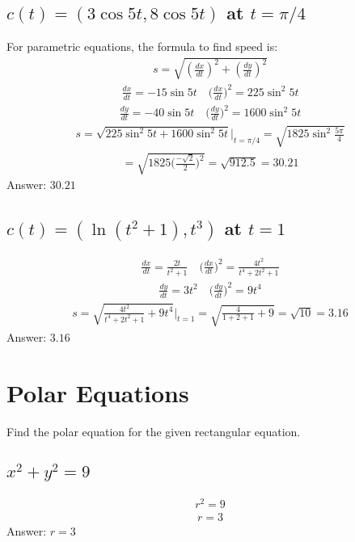 \documentclass{article}
\begin{document}
\subsection{$c(t) = (3 \cos{5t}, 8 \cos{5t})$ at $t = \pi /4$}
For parametric equations, the formula to find speed is:
\begin{align*}
	s = \sqrt{(\frac{dx}{dt})^2 + (\frac{dy}{dt})^2}
\end{align*}
\begin{align*}
	\frac{dx}{dt} = -15\sin{5t} \quad \bigg( \frac{dx}{dt} \bigg)^2 = 225 \sin^2{5t}
\end{align*}
\begin{align*}
	\frac{dy}{dt} = -40 \sin{5t} \quad \bigg( \frac{dy}{dt} \bigg)^2 = 1600 \sin^2{5t}
\end{align*}
\begin{align*}
	s = \sqrt{225\sin^2{5t} + 1600 \sin^2{5t}} \bigg|_{t = \pi/4} = \sqrt{1825 \sin^2{\frac{5\pi}{4}}}
\end{align*}
\begin{align*}
	= \sqrt{1825 \bigg( \frac{-\sqrt{2}}{2} \bigg)^2} = \sqrt{912.5} = 30.21
\end{align*}
Answer: $30.21$

\subsection{$c(t) = (\ln(t^2 + 1), t^3)$ at $t = 1$}
\begin{align*}
	\frac{dx}{dt} = \frac{2t}{t^2 +1} \quad \bigg( \frac{dx}{dt} \bigg)^2 = \frac{4t^2}{t^4 + 2t^2 + 1}
\end{align*}
\begin{align*}
	\frac{dy}{dt} = 3t^2 \quad \bigg( \frac{dy}{dt} \bigg)^2 = 9t^4
\end{align*}
\begin{align*}
	s = \sqrt{\frac{4t^2}{t^4 + 2t^2 + 1} + 9t^4} \bigg|_{t = 1} = \sqrt{\frac{4}{1 + 2 + 1} + 9} = \sqrt{10} = 3.16
\end{align*}
Answer: $3.16$

\section{Polar Equations}

Find the polar equation for the given rectangular equation.
\subsection{$x^2 + y^2 = 9$}
\begin{align*}
	r^2 = 9
\end{align*}
\begin{align*}
	r = 3
\end{align*}
Answer: $r = 3$
\end{document}
